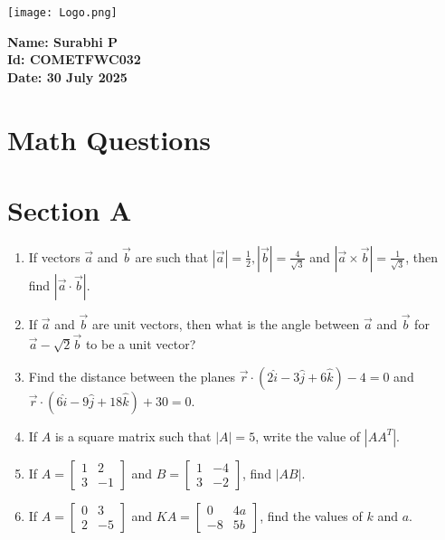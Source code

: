 \documentclass[12pt]{article}
\begin{document}
\begin{minipage}{0.45\textwidth}
  \texttt{[image: Logo.png]}
\end{minipage}
\hfill
\begin{minipage}{0.45\textwidth}
  \raggedleft
  \textbf{Name: Surabhi P}\\
  \textbf{Id: COMETFWC032}\\
  \textbf{Date: 30 July 2025}
\end{minipage}

\section*{Math Questions}

\section*{Section A}

\begin{enumerate}
    \item If vectors $\vec{a}$ and $\vec{b}$ are such that $|\vec{a}|=\tfrac{1}{2}, |\vec{b}|=\tfrac{4}{\sqrt{3}}$ and $|\vec{a}\times \vec{b}|=\tfrac{1}{\sqrt{3}}$, then find $|\vec{a}\cdot \vec{b}|$.

    \item If $\vec{a}$ and $\vec{b}$ are unit vectors, then what is the angle between $\vec{a}$ and $\vec{b}$ for $\vec{a}-\sqrt{2}\vec{b}$ to be a unit vector?

    \item Find the distance between the planes $\vec{r}\cdot(2\hat{i}-3\hat{j}+6\hat{k})-4=0$ and $\vec{r}\cdot(6\hat{i}-9\hat{j}+18\hat{k})+30=0$.

    \item If $A$ is a square matrix such that $|A|=5$, write the value of $|AA^T|$.

    \item If $A=\begin{bmatrix}1 & 2 \\ 3 & -1\end{bmatrix}$ and $B=\begin{bmatrix}1 & -4 \\ 3 & -2\end{bmatrix}$, find $|AB|$.

    \item If $A=\begin{bmatrix}0 & 3 \\ 2 & -5\end{bmatrix}$ and $KA=\begin{bmatrix}0 & 4a \\ -8 & 5b\end{bmatrix}$, find the values of $k$ and $a$.
\end{enumerate}
\end{document}
